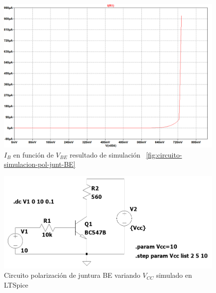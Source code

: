 \documentclass[chaptersright]{informeutn}
\begin{document}
    \begin{figure}[H]
        \centering
        \includegraphics[width=1\textwidth, keepaspectratio]{pictures/curva-simulacion-pol-junt-be.png}
        \caption{$I_B$ en función de $V_{BE}$ resultado de simulación
        ~\ref{fig:circuito-simulacion-pol-junt-BE}}
    \end{figure}

    \begin{figure}[H]
        \centering
        \includegraphics[width=1\textwidth, keepaspectratio]{pictures/circuito-simulacion-pol-junt-BE-variandoVCC.png}
        \caption{Circuito polarización de juntura BE variando $V_{CC}$ simulado en LTSpice}
        \label{fig:circuito-simulacion-pol-junt-BE-variandoVCC}
    \end{figure}
\end{document}
